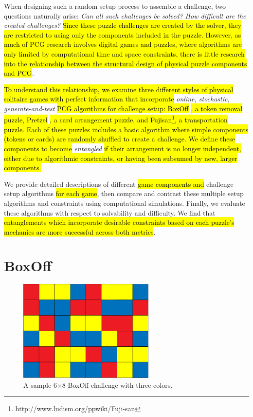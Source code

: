 \documentclass[journal]{IEEEtran}
\begin{document}
When designing such a random setup process to assemble a challenge, two questions naturally arise: {\it Can all such challenges be solved? How difficult are the created challenges? } \hl{Since these puzzle challenges are created by the solver, they are restricted to using only the components included in the puzzle. However, as much of PCG research involves digital games and puzzles, where algorithms are only limited by computational time and space constraints, there is little research into the relationship between the structural design of physical puzzle components and PCG}. 

\hl{To understand this relationship, we examine three different styles of physical solitaire games with perfect information that incorporate} {\it online, stochastic, generate-and-test} \hl{PCG algorithms for challenge setup: BoxOff} \cite{BoxOffGAMES} \hl{, a token removal puzzle, Pretzel} \cite{de1981pretzel} \hl{, a card arrangement puzzle, and Fujisan\footnote{http://www.ludism.org/ppwiki/Fuji-san}, a transportation puzzle. Each of these puzzles includes a basic algorithm where simple components (tokens or cards) are randomly shuffled to create a challenge. We define these components to become} {\it entangled} \hl{if their arrangement is no longer independent, either due to algorithmic constraints, or having been subsumed by new, larger components.}

We provide detailed descriptions of different \hl{game components and} challenge setup algorithms \hl{for each game}, then compare and contrast these multiple setup algorithms and constraints using computational simulations. Finally, we evaluate these algorithms with respect to solvability and difficulty. We find that \hl{entanglements which incorporate desirable constraints based on each puzzle's mechanics are more successful across both metrics}.


\section{BoxOff}

\begin{figure}[t]
\centering
\includegraphics[width=6.8cm]{boxoff6x82.png}
\caption{A sample 6$\times$8 BoxOff challenge with three colors.}
\label{fig:boxoffbig}
\end{figure}
\end{document}
